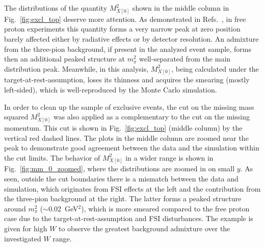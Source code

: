 The distributions of the quantity $M^{2}_{X[0]}$ shown in the middle column in Fig.~\ref{fig:excl_top} deserve more attention. As demonstrated in Refs.~\cite{Fed_an_note:2017,Fed_paper_2018,note_mm_distr}, in free proton experiments this quantity forms a very narrow peak at zero position barely affected either by radiative effects or by detector resolution. An admixture from the three-pion background, if present in the analyzed event sample, forms then an additional peaked structure at $m_{\pi}^{2}$ well-separated from the main distribution peak. Meanwhile, in this analysis, $M^{2}_{X[0]}$, being calculated under the target-at-rest-assumption, loses its thinness and acquires the smearing (mostly left-sided), which is well-reproduced by the Monte Carlo simulation.

In order to clean up the sample of exclusive events, the cut on the missing mass squared $M^{2}_{X[0]}$ was also applied as a complementary to the cut on the missing momentum. This cut is shown in Fig.~\ref{fig:excl_top} (middle column) by the vertical red dashed lines. The plots in the middle column are zoomed near the peak to demonstrate good agreement between the data and the simulation within the cut limits. The behavior of $M^{2}_{X[0]}$ in a wider range is shown in Fig.~\ref{fig:mm_0_zoomed}, where the distributions are zoomed in on small $y$. As seen, outside the cut boundaries there is a mismatch between the data and simulation, which originates from FSI effects at the left and the contribution from the three-pion background at the right. The latter forms a peaked structure around $m_{\pi}^{2}$ ($\sim$0.02~GeV$^{2}$), which is more smeared compared to the free proton case due to the target-at-rest-assumption and FSI disturbances. The example is given for high $W$ to observe the greatest background admixture over the investigated $W$ range.

